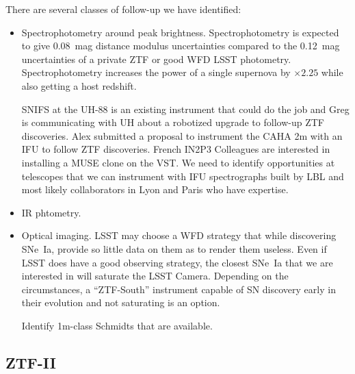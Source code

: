 There are several classes of follow-up we have identified:
\begin{itemize}
\item Spectrophotometry around peak brightness.  Spectrophotometry is expected to give 0.08~mag distance modulus uncertainties compared
to the 0.12~mag uncertainties of a private ZTF or good WFD LSST photometry.  Spectrophotometry increases the power
of a single supernova by $\times 2.25$ while also getting a host redshift.

SNIFS at the UH-88 is an existing instrument that could do the job and Greg is communicating with UH about
a robotized upgrade to follow-up ZTF discoveries.
Alex submitted a proposal to instrument the CAHA 2m with
an IFU to follow ZTF discoveries.  French IN2P3 Colleagues are interested in installing a MUSE clone on the VST.
We need to identify opportunities at telescopes that we can instrument with  IFU spectrographs
built by LBL and most likely collaborators in Lyon and Paris who have expertise.
\item IR phtometry.
\item Optical imaging.  LSST may choose a WFD strategy that while discovering SNe~Ia, provide so little data on them
as to render them useless.  Even if LSST does have a good observing strategy, the closest SNe~Ia that we are interested in
will saturate the LSST Camera.  Depending on the circumstances,
a ``ZTF-South'' instrument capable of SN discovery early in their evolution and not saturating is an option.

Identify 1m-class Schmidts that are available.
\end{itemize}

\subsection{ZTF-II}

